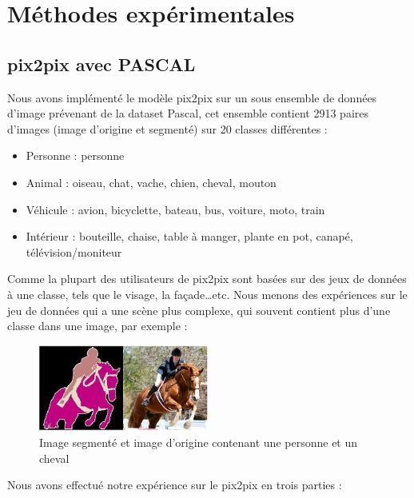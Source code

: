 \chapter{Méthodes expérimentales}

\section{pix2pix avec PASCAL}

Nous avons implémenté le modèle pix2pix sur un sous ensemble de données d'image prévenant de la dataset Pascal, cet ensemble contient 2913 paires d'images (image d'origine et segmenté) sur 20 classes différentes :
\begin{itemize}
	\item Personne : personne 
	\item Animal : oiseau, chat, vache, chien, cheval, mouton
	\item Véhicule : avion, bicyclette, bateau, bus, voiture, moto, train
	\item Intérieur : bouteille, chaise, table à manger, plante en pot, canapé, télévision/moniteur
\end{itemize}

Comme la plupart des utilisateurs de pix2pix sont basées sur des jeux de données à une classe, tels que le visage, la façade…etc. Nous menons des expériences sur le jeu de données qui a une scène plus complexe, qui souvent contient plus d'une classe dans une image, par exemple :


\begin{figure}[H] 
	\centering 
	\includegraphics[width=0.5\textwidth]{./resources/img/im_pascal.jpg} %
	\caption{Image segmenté et image d'origine contenant une personne et un cheval} %
	\label{Fig4_1} %
\end{figure}


\newpage
 Nous avons effectué notre expérience sur le pix2pix en trois parties :
 
